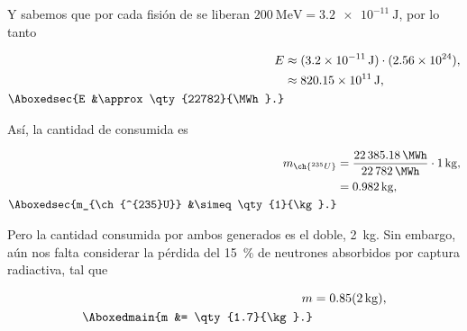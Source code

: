 \documentclass[./../main.tex]{subfiles}
\begin{document}
\begin{exercise}
\begin{solution}
            Y sabemos que por cada fisión de  se liberan \(\qty{200}{\MeV} = \qty{3.2e-11}{\J}\), por lo tanto

            \begin{align*}
                E &\approx (\qty{3.2e-11}{\J})\cdot(\num{2.56e24}),\\
                &\approx \qty{820.15e11}{\J},\\
                \Aboxedsec{E &\approx \qty{22782}{\MWh}.}
            \end{align*}

            Así, la cantidad de  consumida es

            \begin{align*}
                m_{\ch{^{235}U}} &= \dfrac{\qty{22385.18}{\MWh}}{\qty{22782}{\MWh}}\cdot \qty{1}{\kg},\\
                &= \qty{0.982}{\kg},\\
                \Aboxedsec{m_{\ch{^{235}U}} &\simeq \qty{1}{\kg}.}
            \end{align*}

            Pero la cantidad consumida por ambos generados es el doble, \idest \qty{2}{\kg}. Sin embargo, aún nos falta considerar la pérdida del \qty{15}{\percent} de neutrones absorbidos por captura radiactiva, tal que

            \begin{align*}
                m &= 0.85(\qty{2}{\kg}),\\
                \Aboxedmain{m &= \qty{1.7}{\kg}.}
            \end{align*}
        \end{solution}
    \end{exercise}
\end{document}
